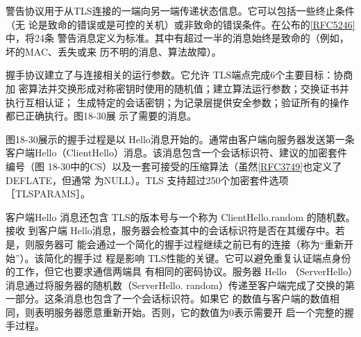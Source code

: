 警告协议用于从TLS连接的一端向另一端传递状态信息。它可以包括一些终止条件（无
论是致命的错误或是可控的关机）或非致命的错误条件。在公布的\href{https://www.rfc-editor.org/rfc/rfc5246}{[RFC5246]}中，将24条
警告消息定义为标准。其中有超过一半的消息始终是致命的（例如，坏的MAC、丢失或来
历不明的消息、算法故障）。

握手协议建立了与连接相关的运行参数。它允许 TLS端点完成6个主要目标：协商加
密算法并交换形成对称密钥时使用的随机值；建立算法运行参数；交换证书并执行互相认证；
生成特定的会话密钥；为记录层提供安全参数；验证所有的操作都已正确执行。图18-30展
示了需要的消息。

图18-30展示的握手过程是以 Hello消息开始的。通常由客户端向服务器发送第一条
客户端Hello（ClientHello）消息。该消息包含一个会话标识符、建议的加密套件编号（图
18-30中的CS）以及一套可接受的压缩算法（虽然\href{https://www.rfc-editor.org/rfc/rfc3749}{[RFC3749]}也定义了 DEFLATE，但通常
为NULL）。TLS 支持超过250个加密套件选项 ［TLSPARAMS］。

客户端Hello 消息还包含 TLS的版本号与一个称为 ClientHello.random 的随机数。接收
到客户端 Hello消息，服务器会检查其中的会话标识符是否在其缓存中。若是，则服务器可
能会通过一个简化的握手过程继续之前已有的连接（称为“重新开始”）。该简化的握手过
程是影响 TLS性能的关键。它可以避免重复认证端点身份的工作，但它也要求通信两端具
有相同的密码协议。服务器 Hello （ServerHello）消息通过将服务器的随机数（ServerHello.
random）传递至客户端完成了交换的第一部分。这条消息也包含了一个会话标识符。如果它
的数值与客户端的数值相同，则表明服务器愿意重新开始。否则，它的数值为0表示需要开
启一个完整的握手过程。

